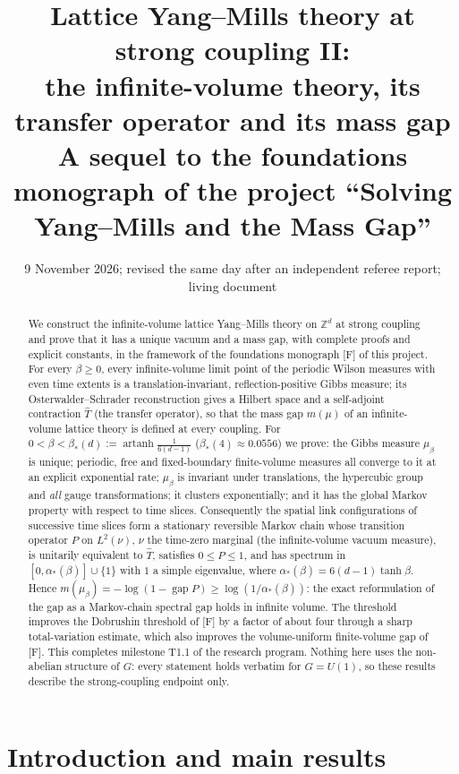\documentclass[11pt,a4paper]{article}
\title{Lattice Yang--Mills theory at strong coupling II:\\ the infinite-volume theory, its transfer operator and its mass gap\\
\large A sequel to the foundations monograph of the project ``Solving Yang--Mills and the Mass Gap''}
\author{}
\date{9 November 2026; revised the same day after an independent referee report; living document}
\theoremstyle{definition}
\theoremstyle{remark}
\DeclareMathOperator{\gap}{gap}
\DeclareMathOperator{\artanh}{artanh}
\newcommand{\Z}{\mathbb{Z}}
\newcommand{\hT}{\hat{T}}
\newcommand{\aS}{\alpha_*}
\newcommand{\bS}{\beta_*}
\begin{document}
\maketitle

\begin{abstract}
We construct the infinite-volume lattice Yang--Mills theory on $\Z^d$ at strong coupling and prove that it has a unique
vacuum and a mass gap, with complete proofs and explicit constants, in the framework of the foundations monograph [F]
of this project. For every $\beta\ge0$, every infinite-volume limit point of the periodic Wilson measures with even time
extents is a translation-invariant, reflection-positive Gibbs measure; its Osterwalder--Schrader reconstruction gives a Hilbert space and
a self-adjoint contraction $\hT$ (the transfer operator), so that the mass gap $m(\mu)$ of an infinite-volume lattice
theory is defined at every coupling. For $0<\beta<\bS(d):=\artanh\frac1{6(d-1)}$ ($\bS(4)\approx0.0556$) we prove: the
Gibbs measure $\mu_\beta$ is unique; periodic, free and fixed-boundary finite-volume measures all converge to it at an
explicit exponential rate; $\mu_\beta$ is invariant under translations, the hypercubic group and \emph{all} gauge
transformations; it clusters exponentially; and it has the global Markov property with respect to time slices. Consequently
the spatial link configurations of successive time slices form a stationary reversible Markov chain whose transition
operator $P$ on $L^2(\nu)$, $\nu$ the time-zero marginal (the infinite-volume vacuum measure), is unitarily equivalent to
$\hT$, satisfies $0\le P\le1$, and has spectrum in $[0,\aS(\beta)]\cup\{1\}$ with $1$ a simple eigenvalue, where
$\aS(\beta)=6(d-1)\tanh\beta$. Hence $m(\mu_\beta)=-\log(1-\gap P)\ge\log(1/\aS(\beta))$: the exact reformulation of the gap
as a Markov-chain spectral gap holds in infinite volume. The threshold improves the Dobrushin threshold of [F] by a factor
of about four through a sharp total-variation estimate, which also improves the volume-uniform finite-volume gap of [F].
This completes milestone T1.1 of the research program. Nothing here uses the non-abelian structure of $G$: every statement
holds verbatim for $G=U(1)$, so these results describe the strong-coupling endpoint only.
\end{abstract}

\tableofcontents

\section{Introduction and main results}\label{iv:sec:intro}
\end{document}
